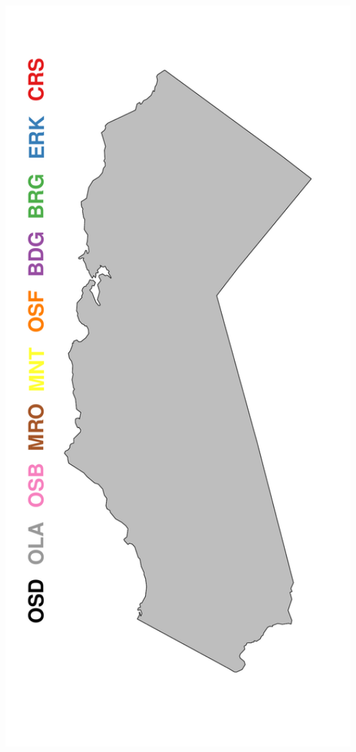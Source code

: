 \documentclass[ xcolor = pdftex, dvipsnames, table ]{beamer}
\begin{document}
\begin{frame}
{\begin{minipage}[h!]{0.19\textwidth}
\end{minipage}
\begin{minipage}[h!]{0.19\textwidth}
        \hspace*{0.5cm}                %
        \includegraphics[width=1.2\textwidth]{../pictures/mapFullSparse.pdf}

\end{minipage}}
\end{frame}
\end{document}
